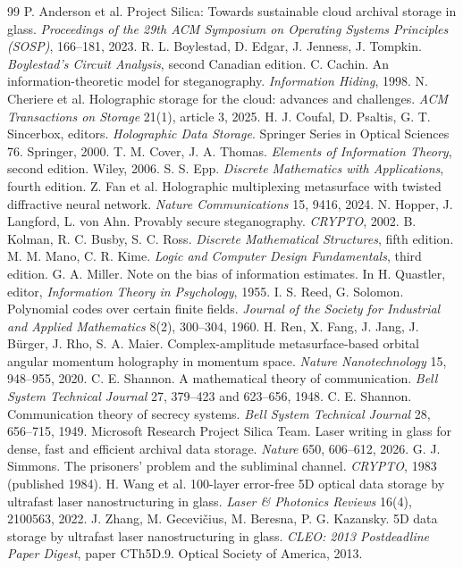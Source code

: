 \begin{thebibliography}{99}
 P. Anderson et al. Project Silica: Towards sustainable cloud archival storage in glass. \emph{Proceedings of the 29th ACM Symposium on Operating Systems Principles (SOSP)}, 166--181, 2023.
 R. L. Boylestad, D. Edgar, J. Jenness, J. Tompkin. \emph{Boylestad's Circuit Analysis}, second Canadian edition.
 C. Cachin. An information-theoretic model for steganography. \emph{Information Hiding}, 1998.
 N. Cheriere et al. Holographic storage for the cloud: advances and challenges. \emph{ACM Transactions on Storage} 21(1), article 3, 2025.
 H. J. Coufal, D. Psaltis, G. T. Sincerbox, editors. \emph{Holographic Data Storage}. Springer Series in Optical Sciences 76. Springer, 2000.
 T. M. Cover, J. A. Thomas. \emph{Elements of Information Theory}, second edition. Wiley, 2006.
 S. S. Epp. \emph{Discrete Mathematics with Applications}, fourth edition.
 Z. Fan et al. Holographic multiplexing metasurface with twisted diffractive neural network. \emph{Nature Communications} 15, 9416, 2024.
 N. Hopper, J. Langford, L. von Ahn. Provably secure steganography. \emph{CRYPTO}, 2002.
 B. Kolman, R. C. Busby, S. C. Ross. \emph{Discrete Mathematical Structures}, fifth edition.
 M. M. Mano, C. R. Kime. \emph{Logic and Computer Design Fundamentals}, third edition.
 G. A. Miller. Note on the bias of information estimates. In H. Quastler, editor, \emph{Information Theory in Psychology}, 1955.
 I. S. Reed, G. Solomon. Polynomial codes over certain finite fields. \emph{Journal of the Society for Industrial and Applied Mathematics} 8(2), 300--304, 1960.
 H. Ren, X. Fang, J. Jang, J. B\"urger, J. Rho, S. A. Maier. Complex-amplitude metasurface-based orbital angular momentum holography in momentum space. \emph{Nature Nanotechnology} 15, 948--955, 2020.
 C. E. Shannon. A mathematical theory of communication. \emph{Bell System Technical Journal} 27, 379--423 and 623--656, 1948.
 C. E. Shannon. Communication theory of secrecy systems. \emph{Bell System Technical Journal} 28, 656--715, 1949.
 Microsoft Research Project Silica Team. Laser writing in glass for dense, fast and efficient archival data storage. \emph{Nature} 650, 606--612, 2026.
 G. J. Simmons. The prisoners' problem and the subliminal channel. \emph{CRYPTO}, 1983 (published 1984).
 H. Wang et al. 100-layer error-free 5D optical data storage by ultrafast laser nanostructuring in glass. \emph{Laser \& Photonics Reviews} 16(4), 2100563, 2022.
 J. Zhang, M. Gecevi\v{c}ius, M. Beresna, P. G. Kazansky. 5D data storage by ultrafast laser nanostructuring in glass. \emph{CLEO: 2013 Postdeadline Paper Digest}, paper CTh5D.9. Optical Society of America, 2013.
\end{thebibliography}

